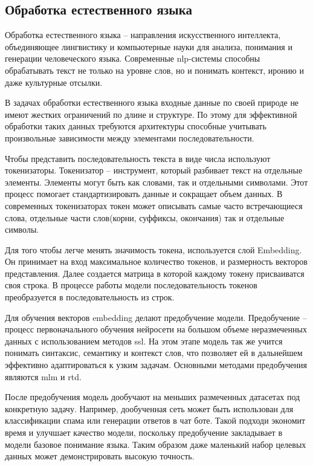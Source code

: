 \documentclass[../part_1.tex]{subfiles}
\begin{document}
\subsection{Обработка естественного языка}
\par Обработка естественного языка -- направления искусственного интеллекта, объединяющее лингвистику и компьютерные науки для анализа, понимания и генерации человеческого языка. Современные \acrshort{nlp}-системы способны обрабатывать текст не только на уровне слов, но и понимать контекст, иронию и даже культурные отсылки.
\par В задачах обработки естественного языка входные данные по своей природе не имеют жестких ограничений по длине и структуре. По этому для эффективной обработки таких данных требуются архитектуры способные учитывать произвольные зависимости между элементами последовательности. 
\par Чтобы представить последовательность текста в виде числа используют токенизаторы. Токенизатор -- инструмент, который разбивает текст на отдельные элементы. Элементы могут быть как словами, так и отдельными символами. Этот процесс помогает стандартизировать данные и сокращает объем данных. В современных токенизаторах токен может описывать самые часто встречающиеся слова, отдельные части слов(корни, суффиксы, окончания) так и отдельные символы. 
\par Для того чтобы легче менять значимость токена, используется слой Embedding. Он принимает на вход максимальное количество токенов, и размерность векторов представления. Далее создается матрица в которой каждому токену присваиватся своя строка. В процессе работы модели последовательность токенов преобразуется в последовательность из строк.
\par Для обучения векторов embedding делают предобучение модели. Предобучение -- процесс первоначального обучения нейросети на большом объеме неразмеченных данных с использованием методов \acrfull{ssl}. На этом этапе модель так же учится понимать синтаксис, семантику и контекст слов, что позволяет ей в дальнейшем эффективно адаптироваться к узким задачам. Основными методами предобучения являются \acrshort{mlm}\cite{sinha2021maskedlanguagemodelingdistributional} и \acrshort{rtd}.
\par После предобучения модель дообучают на меньших размеченных датасетах под конкретную задачу. Например, дообученная сеть может быть использован для классификации спама или генерации ответов в чат боте. Такой подходи экономит время и улучшает качество модели, поскольку предобучение закладывает в модели базовое понимание языка. Таким образом даже маленький набор целевых данных может демонстрировать высокую точность.
\end{document}
